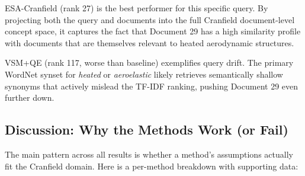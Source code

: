 \documentclass{svproc}
\begin{document}
    ESA-Cranfield (rank 27) is the best performer for this specific query. By projecting both the query and documents into the full Cranfield document-level concept space, it captures the fact that Document 29 has a high similarity profile with documents that are themselves relevant to heated aerodynamic structures.

    VSM+QE (rank 117, worse than baseline) exemplifies query drift. The primary WordNet synset for \textit{heated} or \textit{aeroelastic} likely retrieves semantically shallow synonyms that actively mislead the TF-IDF ranking, pushing Document 29 even further down.

    \subsection{Discussion: Why the Methods Work (or Fail)}

    The main pattern across all results is whether a method's assumptions actually fit the Cranfield domain. Here is a per-method breakdown with supporting data:
\end{document}
